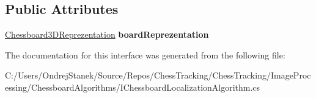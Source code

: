 \subsection*{Public Attributes}
\begin{DoxyCompactItemize}
\item 
\mbox{\label{interface_chess_tracking_1_1_image_processing_1_1_chessboard_algorithms_1_1_i_chessboard_localization_algorithm_a5d480f7fc5aa9d0eb820a9051192cdfe}} 
\mbox{\hyperlink{class_chess_tracking_1_1_image_processing_1_1_chessboard_algorithms_1_1_chessboard3_d_reprezentation}{Chessboard3\+D\+Reprezentation}} {\bfseries board\+Reprezentation}
\end{DoxyCompactItemize}


The documentation for this interface was generated from the following file\+:\begin{DoxyCompactItemize}
\item 
C\+:/\+Users/\+Ondrej\+Stanek/\+Source/\+Repos/\+Chess\+Tracking/\+Chess\+Tracking/\+Image\+Processing/\+Chessboard\+Algorithms/I\+Chessboard\+Localization\+Algorithm.\+cs\end{DoxyCompactItemize}
